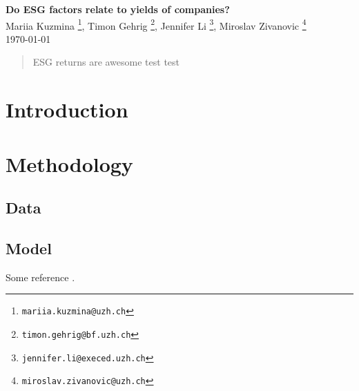 \documentclass[12pt, a4paper]{article}%
\begin{document}
%
%

\begin{titlepage}

\setlength{\topmargin}{0.5cm}

\center

{\Large \bfseries Do ESG factors relate to yields of companies?
}\\[0.5cm] 

Mariia Kuzmina \footnote{\texttt{mariia.kuzmina@uzh.ch}},
Timon Gehrig \footnote{\texttt{timon.gehrig@bf.uzh.ch}},
Jennifer Li \footnote{\texttt{jennifer.li@execed.uzh.ch}},
Miroslav Zivanovic \footnote{\texttt{miroslav.zivanovic@uzh.ch}}\\
\today
\\ [2cm]

\begin{abstract}
ESG returns are awesome test test 
\end{abstract}

\vspace{3cm}



\vfill 
\end{titlepage}

\tableofcontents


%
%
\newpage
\section{Introduction}


%
%												   

\section{Methodology}

\subsection{Data}

\subsection{Model}
Some reference \cite{Paolellalinear}.
\end{document}

